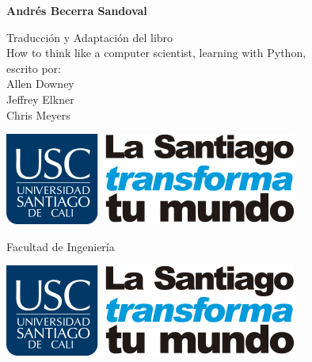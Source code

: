 \thispagestyle{empty} 

\vfill{}
\begin{center}
\textbf{\huge{}\introprog}
\par\end{center}{\huge \par}

\begin{center}
\vfill{}
\par\end{center}

\begin{center}
\textbf{\Large{}Andrés Becerra Sandoval}{\huge{} }
\par\end{center}{\huge \par}

\vfill{}
\begin{flushright}
{\small{}Traducción y Adaptación del libro }\\
{\small{}\flqq{}How to think like a computer scientist, learning
with Python\frqq{}, }\\
{\small{} escrito por: }\\
{\small{} Allen Downey}\\
{\small{} Jeffrey Elkner}\\
{\small{} Chris Meyers}\\
{\small{} } 
\par\end{flushright}

\vfill{}
\begin{center}
\includegraphics[scale=0.3]{illustrations/logo/usclogo} 
\par\end{center}

\begin{center}
{\Large{}Facultad de Ingeniería} 
\par\end{center}

\vfill{}

\newpage{}

\thispagestyle{empty} \vfill{}
\includegraphics[scale=0.3]{illustrations/logo/usclogo} \\

